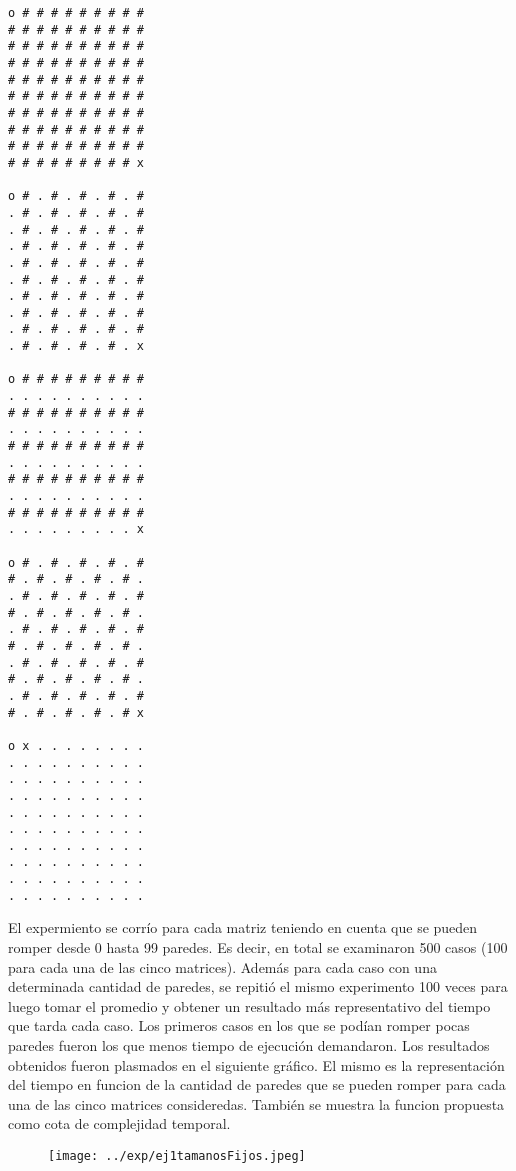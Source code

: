 \begin{itemize}
 \begin{codesnippet}
            \begin{verbatim}
o # # # # # # # # #
# # # # # # # # # #
# # # # # # # # # #
# # # # # # # # # #
# # # # # # # # # #
# # # # # # # # # #
# # # # # # # # # #
# # # # # # # # # #
# # # # # # # # # #
# # # # # # # # # x

o # . # . # . # . #
. # . # . # . # . #
. # . # . # . # . #
. # . # . # . # . #
. # . # . # . # . #
. # . # . # . # . #
. # . # . # . # . #
. # . # . # . # . #
. # . # . # . # . #
. # . # . # . # . x

o # # # # # # # # #
. . . . . . . . . .
# # # # # # # # # #
. . . . . . . . . .
# # # # # # # # # #
. . . . . . . . . .
# # # # # # # # # #
. . . . . . . . . .
# # # # # # # # # #
. . . . . . . . . x

o # . # . # . # . #
# . # . # . # . # .
. # . # . # . # . #
# . # . # . # . # .
. # . # . # . # . #
# . # . # . # . # .
. # . # . # . # . #
# . # . # . # . # .
. # . # . # . # . #
# . # . # . # . # x

o x . . . . . . . .
. . . . . . . . . .
. . . . . . . . . .
. . . . . . . . . .
. . . . . . . . . .
. . . . . . . . . .
. . . . . . . . . .
. . . . . . . . . .
. . . . . . . . . .
. . . . . . . . . .

\end{verbatim}
            \end{codesnippet}

  El expermiento se corrío para cada matriz teniendo en cuenta que se pueden romper desde 0 hasta 99 paredes. Es decir, en total se examinaron 500 casos (100 para cada una de las cinco matrices). Además para cada caso con una determinada cantidad de paredes, se repitió el mismo experimento 100 veces para luego tomar el promedio y obtener un resultado más representativo del tiempo que tarda cada caso. Los primeros casos en los que se podían romper pocas paredes fueron los que menos tiempo de ejecución demandaron.
  Los resultados obtenidos fueron plasmados en el siguiente gráfico. El mismo es la representación del tiempo en funcion de la cantidad de paredes que se pueden romper para cada una de las cinco matrices consideredas. También se muestra la funcion propuesta como cota de complejidad temporal.

  \begin{figure}[H]
      \begin{center}
        \texttt{[image: ../exp/ej1tamanosFijos.jpeg]}
        \caption{}
      \end{center}
  \end{figure}


\end{itemize}
